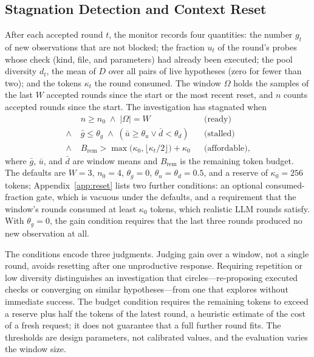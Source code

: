 \documentclass[letterpaper,journal]{IEEEtran}
\begin{document}
\subsection{Stagnation Detection and Context Reset}\label{sec:reset}
After each accepted round $t$, the monitor records four quantities: the number $g_t$ of new observations that are not blocked; the fraction $u_t$ of the round's probes whose check (kind, file, and parameters) had already been executed; the pool diversity $d_t$, the mean of $D$ over all pairs of live hypotheses (zero for fewer than two); and the tokens $\kappa_t$ the round consumed. The window $\Omega$ holds the samples of the last $W$ accepted rounds since the start or the most recent reset, and $n$ counts accepted rounds since the start. The investigation has stagnated when
\begin{equation}\label{eq:reset}
\begin{aligned}
&n\ge n_0\;\wedge\;|\Omega|=W
&&\text{(ready)}\\
\wedge\;&\bar g\le\theta_g\;\wedge\;(\bar u\ge\theta_u\vee\bar d<\theta_d)
&&\text{(stalled)}\\
\wedge\;&B_{\mathrm{rem}}>\max\bigl(\kappa_0,\lfloor\kappa_t/2\rfloor\bigr)+\kappa_0
&&\text{(affordable)},
\end{aligned}
\end{equation}
where $\bar g$, $\bar u$, and $\bar d$ are window means and $B_{\mathrm{rem}}$ is the remaining token budget. The defaults are $W=3$, $n_0=4$, $\theta_g=0$, $\theta_u=\theta_d=0.5$, and a reserve of $\kappa_0=256$ tokens; Appendix~\ref{app:reset} lists two further conditions: an optional consumed-fraction gate, which is vacuous under the defaults, and a requirement that the window's rounds consumed at least $\kappa_0$ tokens, which realistic LLM rounds satisfy. With $\theta_g=0$, the gain condition requires that the last three rounds produced no new observation at all.

The conditions encode three judgments. Judging gain over a window, not a single round, avoids resetting after one unproductive response. Requiring repetition or low diversity distinguishes an investigation that circles---re-proposing executed checks or converging on similar hypotheses---from one that explores without immediate success. The budget condition requires the remaining tokens to exceed a reserve plus half the tokens of the latest round, a heuristic estimate of the cost of a fresh request; it does not guarantee that a full further round fits. The thresholds are design parameters, not calibrated values, and the evaluation varies the window size.
\end{document}
